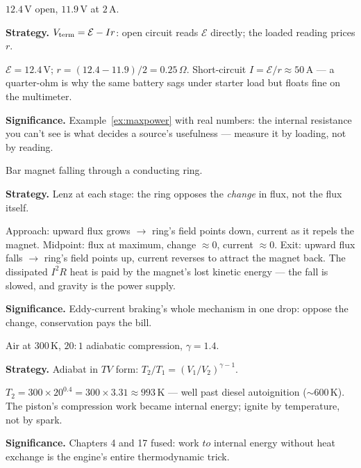 \begin{example}\label{ex:w42}
$12.4$\,V open, $11.9$\,V at $2$\,A.
\par\smallskip
\textbf{Strategy.} $V_{\rm term}=\mathcal E-Ir$: open circuit reads
$\mathcal E$ directly; the loaded reading prices $r$.
\begin{solution}
$\mathcal E=12.4$\,V; $r=(12.4-11.9)/2=0.25\,\Omega$.
Short-circuit $I=\mathcal E/r\approx50$\,A --- a quarter-ohm is why
the same battery sags under starter load but floats fine on the
multimeter. \checkmark
\end{solution}
\textbf{Significance.} Example~\ref{ex:maxpower} with real numbers:
the internal resistance you can't see is what decides a source's
usefulness --- measure it by loading, not by reading.
\end{example}

\begin{example}\label{ex:w43}
Bar magnet falling through a conducting ring.
\par\smallskip
\textbf{Strategy.} Lenz at each stage: the ring opposes the
\emph{change} in flux, not the flux itself.
\begin{solution}
Approach: upward flux grows $\to$ ring's field points down, current
as it repels the magnet. Midpoint: flux at maximum, change
$\approx0$, current $\approx0$. Exit: upward flux falls $\to$ ring's
field points up, current reverses to attract the magnet back.
The dissipated $I^{2}R$ heat is paid by the magnet's lost kinetic
energy --- the fall is slowed, and gravity is the power supply.
\checkmark
\end{solution}
\textbf{Significance.} Eddy-current braking's whole mechanism in one
drop: oppose the change, conservation pays the bill.
\end{example}

\begin{example}\label{ex:w44}
Air at $300$\,K, $20{:}1$ adiabatic compression, $\gamma=1.4$.
\par\smallskip
\textbf{Strategy.} Adiabat in $TV$ form: $T_2/T_1=(V_1/V_2)^{\gamma-1}$.
\begin{solution}
$T_2=300\times20^{0.4}=300\times3.31\approx993$\,K --- well past
diesel autoignition ($\sim600$\,K). The piston's compression work
became internal energy; ignite by temperature, not by spark.
\checkmark
\end{solution}
\textbf{Significance.} Chapters 4 and 17 fused: work $to$ internal
energy without heat exchange is the engine's entire thermodynamic
trick.
\end{example}

